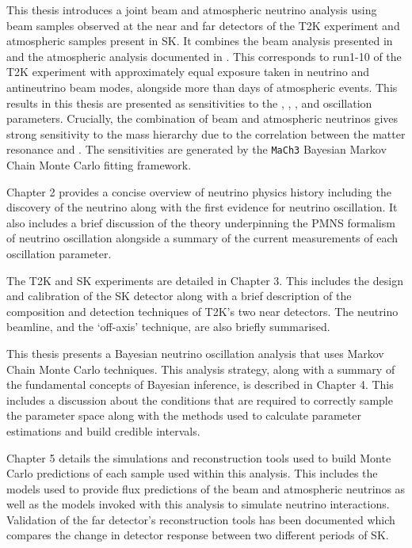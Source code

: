 This thesis introduces a joint beam and atmospheric neutrino analysis using beam samples observed at the near and far detectors of the T2K experiment and atmospheric samples present in SK. It combines the beam analysis presented in \cite{Dunne2020-uf} and the atmospheric analysis documented in \cite{Jiang2019-iw}. This corresponds to run1-10 of the T2K experiment with approximately equal exposure taken in neutrino and antineutrino beam modes, alongside more than  days of atmospheric events. This results in this thesis are presented as sensitivities to the , , , and  oscillation parameters. Crucially, the combination of beam and atmospheric neutrinos gives strong sensitivity to the mass hierarchy due to the correlation between the matter resonance and . The sensitivities are generated by the \texttt{MaCh3} Bayesian Markov Chain Monte Carlo fitting framework.

Chapter 2 provides a concise overview of neutrino physics history including the discovery of the neutrino along with the first evidence for neutrino oscillation. It also includes a brief discussion of the theory underpinning the PMNS formalism of neutrino oscillation alongside a summary of the current measurements of each oscillation parameter.

The T2K and SK experiments are detailed in Chapter 3. This includes the design and calibration of the SK detector along with a brief description of the composition and detection techniques of T2K's two near detectors. The neutrino beamline, and the `off-axis' technique, are also briefly summarised. 

This thesis presents a Bayesian neutrino oscillation analysis that uses Markov Chain Monte Carlo techniques. This analysis strategy, along with a summary of the fundamental concepts of Bayesian inference, is described in Chapter 4. This includes a discussion about the conditions that are required to correctly sample the parameter space along with the methods used to calculate parameter estimations and build credible intervals.

Chapter 5 details the simulations and reconstruction tools used to build Monte Carlo predictions of each sample used within this analysis. This includes the models used to provide flux predictions of the beam and atmospheric neutrinos as well as the models invoked with this analysis to simulate neutrino interactions. Validation of the far detector's reconstruction tools has been documented which compares the change in detector response between two different periods of SK.

